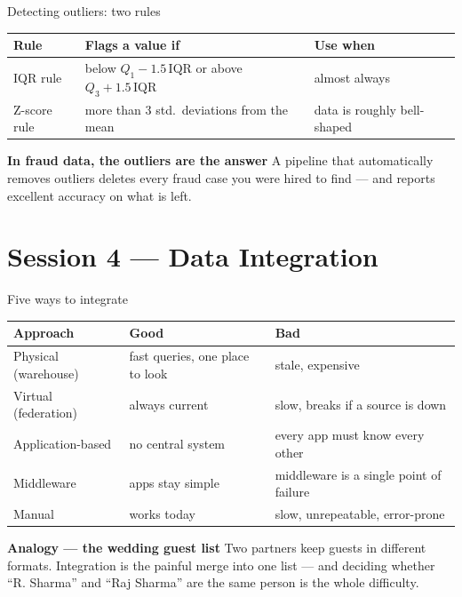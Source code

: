 \documentclass[10pt,aspectratio=169]{beamer}
\newcommand{\trapbox}[2]{%
  \begin{alertblock}{\textbf{#1}}
  #2
  \end{alertblock}%
}
\newcommand{\analogybox}[2]{%
  \begin{exampleblock}{\textbf{Analogy --- #1}}
  #2
  \end{exampleblock}%
}
\begin{document}
\begin{frame}{Detecting outliers: two rules}
\begin{table}
\small
\begin{tabularx}{\linewidth}{@{}lXX@{}}
\toprule
\textbf{Rule} & \textbf{Flags a value if} & \textbf{Use when} \\
\midrule
IQR rule & below $Q_1-1.5\,\mathrm{IQR}$ or above $Q_3+1.5\,\mathrm{IQR}$ & almost always \\
Z-score rule & more than 3 std.\ deviations from the mean & data is roughly bell-shaped \\
\bottomrule
\end{tabularx}
\end{table}
\trapbox{In fraud data, the outliers are the answer}{A pipeline that automatically removes outliers deletes every fraud case you were hired to find --- and reports excellent accuracy on what is left.}
\end{frame}

\section{Session 4 --- Data Integration}

\begin{frame}{Five ways to integrate}
\begin{table}
\footnotesize
\begin{tabularx}{\linewidth}{@{}lXX@{}}
\toprule
\textbf{Approach} & \textbf{Good} & \textbf{Bad} \\
\midrule
Physical (warehouse) & fast queries, one place to look & stale, expensive \\
Virtual (federation) & always current & slow, breaks if a source is down \\
Application-based & no central system & every app must know every other \\
Middleware & apps stay simple & middleware is a single point of failure \\
Manual & works today & slow, unrepeatable, error-prone \\
\bottomrule
\end{tabularx}
\end{table}
\analogybox{the wedding guest list}{Two partners keep guests in different formats. Integration is the painful merge into one list --- and deciding whether ``R. Sharma'' and ``Raj Sharma'' are the same person is the whole difficulty.}
\end{frame}
\end{document}
